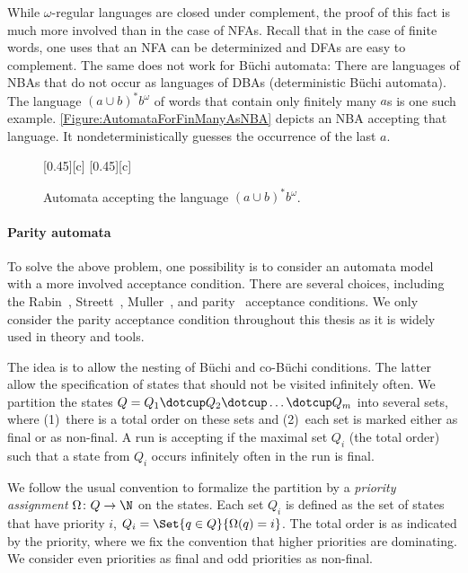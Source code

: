 \documentclass[../../diss.tex]{subfiles}
\begin{document}
While $\omega$-regular languages are closed under complement, the proof of this fact is much more involved than in the case of NFAs.
Recall that in the case of finite words, one uses that an NFA can be determinized and DFAs are easy to complement.
The same does not work for Büchi automata:
There are languages of NBAs that do not occur as languages of DBAs (deterministic Büchi automata).
The language ${(a \cup b)}^* b^\omega$ of words that contain only finitely many $a$s is one such example.
\cref{Figure:AutomataForFinManyAsNBA} depicts an NBA accepting that language.
It nondeterministically guesses the occurrence of the last $a$.

\begin{figure}[t]
    {\centering{}[0.45\textwidth][c]{
        }
    }
    {\centering{}[0.45\textwidth][c]{
        }
    }
    \caption{Automata accepting the language ${(a \cup b)}^* b^\omega$.}%
    \label{Figure:AutomataForFinManyAs}%
\end{figure}

\paragraph{Parity automata}

To solve the above problem, one possibility is to consider an automata model with a more involved acceptance condition.
There are several choices, including the Rabin~\cite{Rabin68}, Streett~\cite{Streett81}, Muller~\cite{Muller63}, and parity~\cite{Mostowski84} acceptance conditions.
We only consider the parity acceptance condition throughout this thesis as it is widely used in theory and tools.

The idea is to allow the nesting of Büchi and co-Büchi conditions.
The latter allow the specification of states that should not be visited infinitely often.
We partition the states $Q = Q_1 \dotcup Q_2 \dotcup \ldots \dotcup Q_m$ into several sets, where (1)~there is a total order on these sets and (2)~each set is marked either as final or as non-final.
A run is accepting if the maximal set $Q_i$ (\wrt the total order) such that a state from $Q_i$ occurs infinitely often in the run is final.

We follow the usual convention to formalize the partition by a \emph{priority assignment}
\(
    \Omega \colon Q \to \N
\)
on the states.
Each set $Q_i$ is defined as the set of states that have priority $i$, $Q_i = \Set{ q \in Q}{ \Omega(q) = i}$.
The total order is as indicated by the priority, where we fix the convention that higher priorities are dominating.
We consider even priorities as final and odd priorities as non-final.
\end{document}
